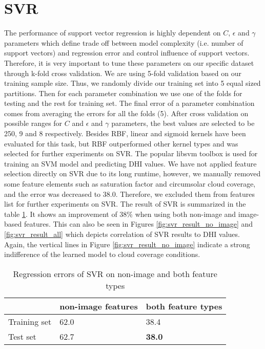 \section{SVR}
The performance of support vector regression is highly dependent on $C$, $\epsilon$ and $\gamma$ parameters which define trade off between model complexity (i.e. number of support vectors) and regression error and control influence of support vectors. Therefore, it is very important to tune these parameters on our specific dataset through k-fold cross validation. We are using 5-fold validation based on our training sample size. Thus, we randomly divide our training set into 5 equal sized partitions. Then for each parameter combination we use one of the folds for testing and the rest for training set. The final error of a parameter combination comes from averaging the errors for all the folds (5). After cross validation on possible ranges for $C$ and $\epsilon$  and $\gamma$ parameters, the best values are selected to be 250, 9 and 8 respectively. Besides RBF, linear and sigmoid kernels have been evaluated for this task, but RBF outperformed other kernel types and was selected for further experiments on SVR. The popular libsvm toolbox is used for training an SVM model and predicting DHI values. We have not applied feature selection directly on SVR due to its long runtime, however, we manually removed some feature elements such as saturation factor and circumsolar cloud coverage, and the error was decreased to 38.0. Therefore, we excluded them from features list for further experiments on SVR.\newline
The result of SVR is summarized in the table \ref{table:rmse_svr}. It shows an improvement of 38\% when using both non-image and image-based features. This can also be seen in Figures \ref{fig:svr_result_no_image} and \ref{fig:svr_result_all} which depicts correlation of SVR results to DHI values. Again, the vertical lines in Figure \ref{fig:svr_result_no_image} indicate a strong indifference of the learned model to cloud coverage conditions.

\begin{table}[h!]
\centering
\begin{tabular}{ |p{2.5cm}||p{4cm}|p{4cm}|  }
 \hline
 &non-image features& both feature types\\
 \hline
 Training set &   62.0  & 38.4 \\
 Test set&   62.7  & \textbf{38.0} \\
 \hline
\end{tabular}
\caption{Regression errors of SVR on non-image and both feature types}
\label{table:rmse_svr}
\end{table}

